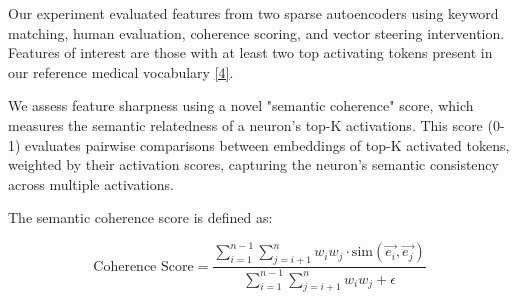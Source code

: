 


Our experiment evaluated features from two sparse autoencoders using keyword matching, human evaluation, coherence scoring, and vector steering intervention. Features of interest are those with at least two top activating tokens present in our reference medical vocabulary \hyperlink{med-gpt2}{[4]}.

We assess feature sharpness using a novel "semantic coherence" score, which measures the semantic relatedness of a neuron's top-K activations. This score (0-1) evaluates pairwise comparisons between embeddings of top-K activated tokens, weighted by their activation scores, capturing the neuron's semantic consistency across multiple activations.

The semantic coherence score is defined as:

\begin{equation}
\text{Coherence Score} = \frac{\sum_{i=1}^{n-1} \sum_{j=i+1}^n w_i w_j \cdot \text{sim}(\vec{e_i}, \vec{e_j})}{\sum_{i=1}^{n-1} \sum_{j=i+1}^n w_i w_j + \epsilon}
\end{equation}

